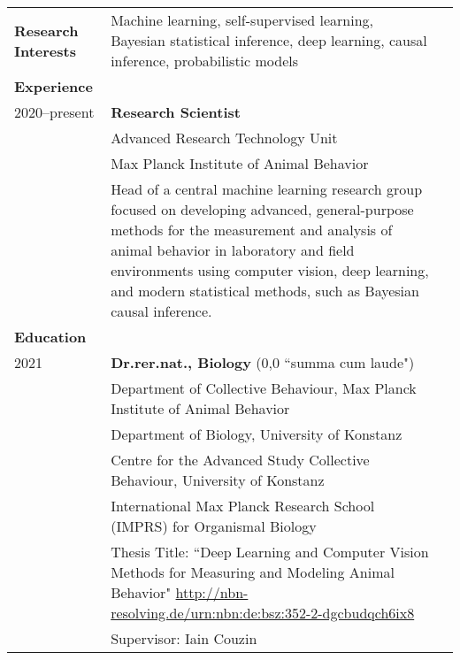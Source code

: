 \documentclass[letterpaper,10pt,oneside]{article}
\newcommand{\tabitem}{\hspace{2mm}\textbullet\hspace{2mm}}
\begin{document}
\begin{small}
\noindent \begin{longtable}{@{} l p{5in}l}

\large{\textbf{Research Interests}}
& Machine learning, self-supervised learning, Bayesian statistical inference, deep learning, causal inference, probabilistic models \vspace{2mm}\\ 

\Large{\textbf{Experience}} \vspace{2mm} \\
\large{2020--present} 
& \textbf{Research Scientist} \\
& {Advanced Research Technology Unit} \\
& {Max Planck Institute of Animal Behavior} \\
& \tabitem Head of a central machine learning research group focused on developing advanced, general-purpose methods for the measurement and analysis of animal behavior in laboratory and field environments using computer vision, deep learning, and modern statistical methods, such as Bayesian causal inference.\vspace{5mm} \\

\Large{\textbf{Education}} \vspace{2mm} \\
 \large{2021} 
 & \textbf{Dr.rer.nat., Biology} (0,0 ``summa cum laude")\\
  &   {Department of Collective Behaviour, Max Planck Institute of Animal Behavior} \\
 &   {Department of Biology, University of Konstanz} \\
 &  {Centre for the Advanced Study Collective Behaviour, University of Konstanz} \\
 &   {International Max Planck Research School (IMPRS) for Organismal Biology} \\
 &  \tabitem Thesis Title: ``Deep Learning and Computer Vision Methods for Measuring and Modeling Animal Behavior" \href{http://nbn-resolving.de/urn:nbn:de:bsz:352-2-dgcbudqch6ix8}{http://nbn-resolving.de/urn:nbn:de:bsz:352-2-dgcbudqch6ix8} \\
 & \tabitem Supervisor: Iain Couzin \vspace{2mm}  \\


\end{longtable}
\end{small}
\end{document}
